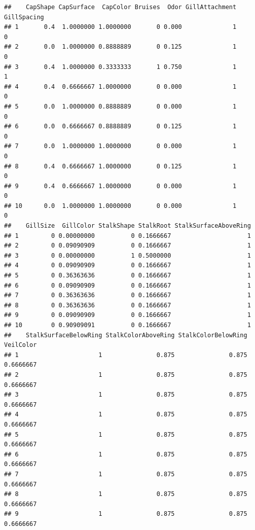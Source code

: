 \documentclass[10pt  ,usenames, dvipsnames]{article}\usepackage[]{graphicx}\usepackage[]{color}
\makeatletter
\newenvironment{kframe}{%
 \def\at@end@of@kframe{}%
 \ifinner\ifhmode%
  \def\at@end@of@kframe{\end{minipage}}%
  \begin{minipage}{\columnwidth}%
 \fi\fi%
 \def\FrameCommand##1{\hskip\@totalleftmargin \hskip-\fboxsep
 \colorbox{shadecolor}{##1}\hskip-\fboxsep
     \hskip-\linewidth \hskip-\@totalleftmargin \hskip\columnwidth}%
 \MakeFramed {\advance\hsize-\width
   \@totalleftmargin\z@ \linewidth\hsize
   \@setminipage}}%
 {\par\unskip\endMakeFramed%
 \at@end@of@kframe}
\newenvironment{knitrout}{}{} %
\makeatother
\begin{document}
\begin{knitrout}
\color{fgcolor}\begin{kframe}
\begin{verbatim}
##    CapShape CapSurface  CapColor Bruises  Odor GillAttachment GillSpacing
## 1       0.4  1.0000000 1.0000000       0 0.000              1           0
## 2       0.0  1.0000000 0.8888889       0 0.125              1           0
## 3       0.4  1.0000000 0.3333333       1 0.750              1           1
## 4       0.4  0.6666667 1.0000000       0 0.000              1           0
## 5       0.0  1.0000000 0.8888889       0 0.000              1           0
## 6       0.0  0.6666667 0.8888889       0 0.125              1           0
## 7       0.0  1.0000000 1.0000000       0 0.000              1           0
## 8       0.4  0.6666667 1.0000000       0 0.125              1           0
## 9       0.4  0.6666667 1.0000000       0 0.000              1           0
## 10      0.0  1.0000000 1.0000000       0 0.000              1           0
##    GillSize  GillColor StalkShape StalkRoot StalkSurfaceAboveRing
## 1         0 0.00000000          0 0.1666667                     1
## 2         0 0.09090909          0 0.1666667                     1
## 3         0 0.00000000          1 0.5000000                     1
## 4         0 0.09090909          0 0.1666667                     1
## 5         0 0.36363636          0 0.1666667                     1
## 6         0 0.09090909          0 0.1666667                     1
## 7         0 0.36363636          0 0.1666667                     1
## 8         0 0.36363636          0 0.1666667                     1
## 9         0 0.09090909          0 0.1666667                     1
## 10        0 0.90909091          0 0.1666667                     1
##    StalkSurfaceBelowRing StalkColorAboveRing StalkColorBelowRing VeilColor
## 1                      1               0.875               0.875 0.6666667
## 2                      1               0.875               0.875 0.6666667
## 3                      1               0.875               0.875 0.6666667
## 4                      1               0.875               0.875 0.6666667
## 5                      1               0.875               0.875 0.6666667
## 6                      1               0.875               0.875 0.6666667
## 7                      1               0.875               0.875 0.6666667
## 8                      1               0.875               0.875 0.6666667
## 9                      1               0.875               0.875 0.6666667

\end{verbatim}
\end{kframe}
\end{knitrout}
\end{document}
